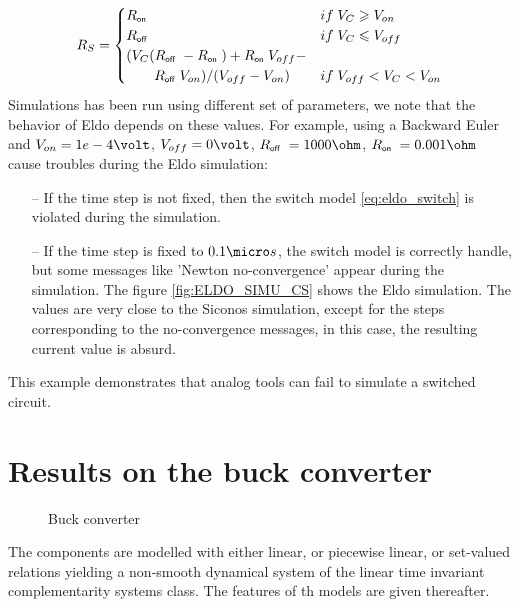   \begin{equation}
    \label{eq:eldo_switch}
    R_S=\begin{cases}R_\on\; & \mbox{if}\;V_{C} \geq V_{on} \\   R_\off\;  & \mbox{if}\;V_{C} \leq
    V_{off} \\ (V_{C}(R_\off\;-R_\on\;)+ R_\on\; V_{off}- \\ \qquad R_\off\;V_{on})/(V_{off}-V_{on})& \mbox{if}\;V_{off}<V_{C} < V_{on} \end{cases}
  \end{equation}
Simulations has been run using different set of parameters, we note that the
behavior of {\sc Eldo} depends on these values. For example, using a Backward Euler and $V_{on}=1e-4
\volt$, $V_{off}=0 \volt$,
$R_\off\; = 1000 \ohm$, $R_\on\;=0.001\ohm$ cause troubles during the {\sc Eldo}
simulation:
\begin{enumerate}
\item [--] If the time step is not fixed, then the switch model \ref{eq:eldo_switch} is violated during the
  simulation.
  \item[--] If the time step is fixed to $0.1 \micro s$, the switch model is correctly handle, but
  some messages like 'Newton no-convergence' appear during the simulation. The figure \ref{fig:ELDO_SIMU_CS}
  shows the {\sc Eldo} simulation. The values are very close to the {\sc Siconos} simulation, except for the steps corresponding to the
  no-convergence messages, in this case, the resulting current value is absurd. 
\end{enumerate}


This example demonstrates that analog tools can fail to simulate a switched circuit.

\section{Results on the buck converter}
\label{section4}


\begin{figure}[!ht]
\centerline{
 \scalebox{1.0}{
    
 }
}
\caption{Buck converter}
\label{fig-Buck-converter}
\end{figure}
The components are modelled with either linear, or piecewise linear, or set-valued relations yielding a non-smooth dynamical system of the linear time invariant complementarity systems class. The features of th models are given thereafter.

